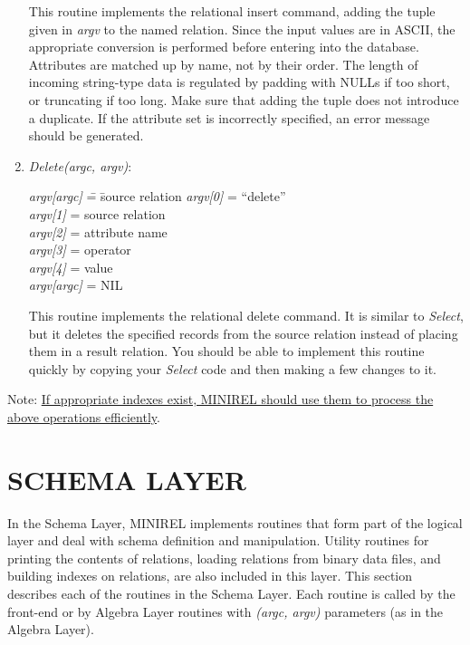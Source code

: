 \begin{enumerate}
This routine implements the relational insert command, adding the
tuple given in \emph{argv} to the named relation.  Since the input
values are in ASCII, the appropriate conversion is performed before
entering into the database.  Attributes are matched up by name,
not by their order.  The length of incoming string-type data is
regulated by padding with NULLs if too short, or truncating if too
long.  Make sure that adding the tuple does not introduce a duplicate.
If the attribute set is incorrectly specified, an error message
should be generated.

\item \emph{Delete(argc, argv)}:
\begin{tabbing}
\hspace*{0.2in}\emph{argv[argc]} \= = \= source relation  \kill
\hspace*{0.2in}\emph{argv[0]}    \> = \> ``delete''       \\
\hspace*{0.2in}\emph{argv[1]}    \> = \> source relation  \\
\hspace*{0.2in}\emph{argv[2]}    \> = \> attribute name   \\
\hspace*{0.2in}\emph{argv[3]}    \> = \> operator         \\
\hspace*{0.2in}\emph{argv[4]}    \> = \> value            \\
\hspace*{0.2in}\emph{argv[argc]} \> = \> NIL
\end{tabbing}

This routine implements the relational delete command.  It is similar
to \emph{Select}, but it deletes the specified records from the source
relation instead of placing them in a result relation.  You should be
able to implement this routine quickly by copying your \emph{Select}
code and then making a few changes to it.
\end{enumerate}

Note: \underline{If appropriate indexes exist, MINIREL
should use them to process the above operations efficiently}.


\section{SCHEMA LAYER}

In the Schema Layer, MINIREL implements routines that form part of
the logical layer and deal with schema definition and manipulation.
Utility routines for printing the contents of relations, loading
relations from binary data files, and building indexes on relations,
are also included in this layer.  This section describes each of
the routines in the Schema Layer.  Each routine is called by the
front-end or by Algebra Layer routines with \emph{(argc, argv)}
parameters (as in the Algebra Layer).


